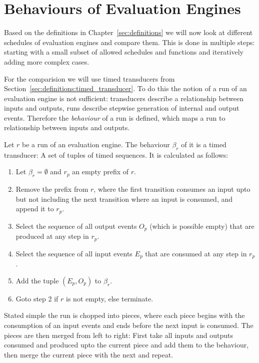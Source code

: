 \chapter{Behaviours of Evaluation Engines}
\label{sec:behaviours}

Based on the definitions in Chapter~\ref{sec:definitions} we will now look at different schedules of evaluation engines and compare them.
This is done in multiple steps: starting with a small subset of allowed schedules and functions and iteratively adding more complex cases.

For the comparision we will use timed transducers from Section~\ref{sec:definitions:timed_transducer}.
To do this the notion of a run of an evaluation engine is not sufficient: transducers describe a relationship between inputs and outputs, runs describe stepwise generation of internal and output events.
Therefore the \emph{behaviour} of a run is defined, which maps a run to relationship between inputs and outputs.

\begin{definition}[name = Behaviour of a Run]\label{def:behaviour_run}
  Let \(r\) be a run of an evaluation engine.
  The behaviour \(\beta_r\) of it is a timed transducer: A set of tuples of timed sequences.
  It is calculated as follows:
  \begin{enumerate}
    \item Let \(\beta_r = \emptyset\) and \(r_p\) an empty prefix of \(r\).
    \item Remove the prefix  from \(r\), where the first transition consumes an input upto but not including the next transition where an input is consumed, and append it to \(r_p\).
    \item Select the sequence of all output events \(O_p\) (which is possible empty) that are produced at any step in \(r_p\).
    \item Select the sequence of all input events \(E_p\) that are consumed at any step in \(r_p\).
    \item Add the tuple \((E_p,O_p)\) to \(\beta_r\).
    \item Goto step 2 if \(r\) is not empty, else terminate.
  \end{enumerate}

  Stated simple the run is chopped into pieces, where each piece begins with the consumption of an input events and ends before the next input is consumed.
  The pieces are then merged from left to right: First take all inputs and outputs consumed and produced upto the current piece and add them to the behaviour, then merge the current piece with the next and repeat.
\end{definition}

